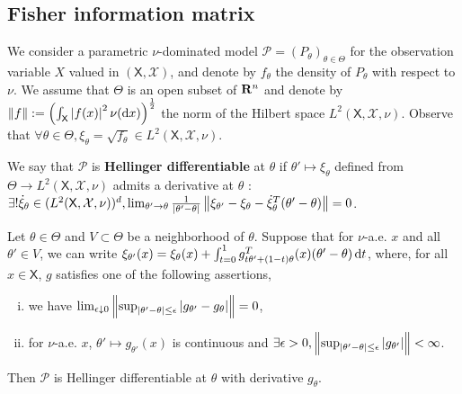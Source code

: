 
\subsection{Fisher information matrix}

	We consider a parametric $\nu$-dominated model $\mathcal{P} = (P_\theta)_{\theta \in \Theta}$ for the observation variable $X$ valued in $(\mathsf{X},\mathcal{X})$, and denote by $f_\theta$ the density of $P_\theta$ with respect to $\nu$.
	We assume that $\Theta$ is an open subset of $\mathbf{R}^n$ and denote by $\left\lVert f\right\rVert := \left( \int_{\mathsf{X}} \left\lvert f(x)\right\rvert^2 \nu(\mathop{}\mathopen{}\mathrm{d} x) \right)^{\frac{1}{2}}$ the norm of the Hilbert space $L^2(\mathsf{X},\mathcal{X},\nu)$.
	Observe that $\forall \theta \in \Theta, \xi_\theta = \sqrt{f_\theta} \in L^2(\mathsf{X},\mathcal{X},\nu)$.

	\begin{defn}
		We say that $\mathcal{P}$ is \textbf{Hellinger differentiable} at $\theta$ if $\theta' \mapsto \xi_\theta$ defined from $\Theta \to L^2(\mathsf{X},\mathcal{X},\nu)$ admits a derivative at $\theta$ : $\exists ! \Dot{\xi}_\theta \in (L^2(\mathsf{X},\mathcal{X},\nu))^d, \lim_{\theta' \to \theta} \frac{1}{\left\lvert\theta' - \theta\right\rvert} \left\lVert\xi_{\theta'} - \xi_{\theta} - \Dot{\xi}_\theta^T(\theta' - \theta)\right\rVert = 0$.
	\end{defn}

	\begin{lem}
		Let $\theta \in \Theta$ and $V \subset \Theta$ be a neighborhood of $\theta$.
		Suppose that for $\nu$-a.e. $x$ and all $\theta' \in V$, we can write $\xi_{\theta'}(x) = \xi_{\theta}(x) + \int_{t = 0}^1 g_{t \theta' + (1-t) \theta}^T(x) (\theta' - \theta) \mathop{}\mathopen{}\mathrm{d} t$, where, for all $x \in \mathsf{X}$, $g$ satisfies one of the following assertions,
		\begin{enumerate}[(i)]
			\item we have $\lim_{\epsilon \downarrow 0} \left\lVert\sup_{\left\lvert\theta' - \theta\right\rvert \leq \epsilon} \left\lvert g_{\theta'} - g_\theta\right\rvert\right\rVert = 0$,
			\item for $\nu$-a.e. $x$, $\theta' \mapsto g_{\theta'}(x)$ is continuous and $\exists \epsilon > 0, \left\lVert\sup_{\left\lvert\theta' - \theta\right\rvert \leq \epsilon} \left\lvert g_{\theta'}\right\rvert\right\rVert < \infty$.
		\end{enumerate}
		Then $\mathcal{P}$ is Hellinger differentiable at $\theta$ with derivative $g_\theta$.
	\end{lem}
	
